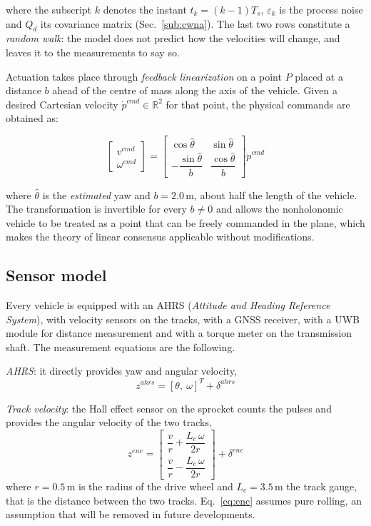 \documentclass[conference,9pt]{IEEEtran}
\begin{document}
where the subscript $k$ denotes the instant $t_k = (k-1)T_s$, $\varepsilon_k$
is the process noise and $Q_d$ its covariance matrix (Sec.~\ref{sub:cwna}).
The last two rows constitute a \emph{random walk}: the model does not predict
how the velocities will change, and leaves it to the measurements to say so.

Actuation takes place through \emph{feedback linearization} on a point $P$
placed at a distance $b$ ahead of the centre of mass along the axis of the
vehicle. Given a desired Cartesian velocity $\dot{p}^{cmd} \in \mathbb{R}^2$
for that point, the physical commands are obtained as:

\begin{equation}
\begin{bmatrix} v^{cmd}\\ \omega^{cmd}\end{bmatrix}
=
\begin{bmatrix}
\cos\hat\theta & \sin\hat\theta\\[1ex]
-\dfrac{\sin\hat\theta}{b} & \dfrac{\cos\hat\theta}{b}
\end{bmatrix}
\dot{p}^{cmd}
\label{eq:fl}
\end{equation}

where $\hat\theta$ is the \emph{estimated} yaw and $b = 2.0$\,m, about half the
length of the vehicle. The transformation is invertible for every
$b \neq 0$ and allows the nonholonomic vehicle to be treated as a point that
can be freely commanded in the plane, which makes the theory of linear
consensus applicable without modifications.

\subsection{Sensor model}

Every vehicle is equipped with an AHRS (\emph{Attitude and Heading Reference
System}), with velocity sensors on the tracks, with a GNSS receiver, with a UWB
module for distance measurement and with a torque meter on the transmission
shaft. The measurement equations are the following.

\emph{AHRS}: it directly provides yaw and angular velocity,
\begin{equation}
z^{ahrs} = [\theta,\ \omega]^T + \delta^{ahrs}
\end{equation}

\emph{Track velocity}: the Hall effect sensor on the sprocket counts the
pulses and provides the angular velocity of the two tracks,
\begin{equation}
z^{enc} =
\begin{bmatrix}
\dfrac{v}{r} + \dfrac{L_c\,\omega}{2r}\\[2ex]
\dfrac{v}{r} - \dfrac{L_c\,\omega}{2r}
\end{bmatrix}
+ \delta^{enc}
\label{eq:enc}
\end{equation}
where $r = 0.5$\,m is the radius of the drive wheel and $L_c = 3.5$\,m the
track gauge, that is the distance between the two tracks. Eq.~\eqref{eq:enc}
assumes pure rolling, an assumption that will be removed in future
developments.
\end{document}
